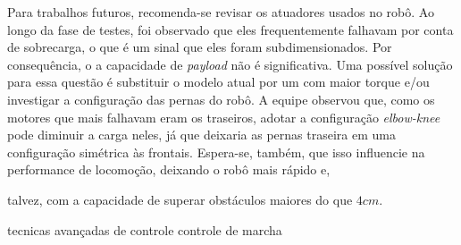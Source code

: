 \documentclass[../main.tex]{subfiles}
\begin{document}
Para trabalhos futuros, recomenda-se revisar os atuadores usados no robô. Ao longo da fase de testes, foi observado que eles frequentemente falhavam por conta de sobrecarga, o que é um sinal que eles foram subdimensionados. Por consequência, o a capacidade de \textit{payload} não é significativa. Uma possível solução para essa questão é substituir o modelo atual por um com maior torque e/ou investigar a configuração das pernas do robô. A equipe observou que, como os motores que mais falhavam eram os traseiros, adotar a configuração \textit{elbow-knee} pode diminuir a carga neles, já que deixaria as pernas traseira em uma configuração simétrica às frontais. Espera-se, também, que isso influencie na performance de locomoção, deixando o robô mais rápido e, 

talvez, com a capacidade de superar obstáculos maiores do que $4cm$.  

tecnicas avançadas de controle
controle de marcha
\end{document}
